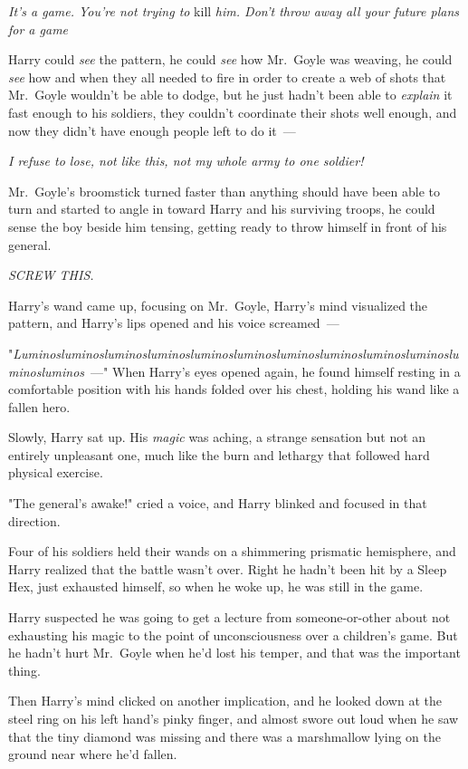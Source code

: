 \emph{It's a game. You're not trying to} kill \emph{him. Don't throw away all
your future plans for a game{\el}}

Harry could \emph{see} the pattern, he could \emph{see} how Mr.~Goyle was
weaving, he could \emph{see} how and when they all needed to fire in order to
create a web of shots that Mr.~Goyle wouldn't be able to dodge, but he just
hadn't been able to \emph{explain} it fast enough to his soldiers, they
couldn't coordinate their shots well enough, and now they didn't have enough
people left to do it~---

\emph{I refuse to lose, not like this, not my whole army to one soldier!}

Mr.~Goyle's broomstick turned faster than anything should have been able to
turn and started to angle in toward Harry and his surviving troops, he could
sense the boy beside him tensing, getting ready to throw himself in front of
his general.

\emph{SCREW THIS.}

Harry's wand came up, focusing on Mr.~Goyle, Harry's mind visualized the
pattern, and Harry's lips opened and his voice screamed~---

"\emph{Lu\-min\-os\-lu\-min\-os\-lu\-min\-os\-lu\-min\-os\-lu\-min\-os\-lu\-min\-os\-lu\-min\-os\-lu\-min\-os\-lu\-min\-os\-lu\-min\-os\-lu\-min\-os\-lu\-min\-os}~---"
\sbreak
When Harry's eyes opened again, he found himself resting in a comfortable
position with his hands folded over his chest, holding his wand like a fallen
hero.

Slowly, Harry sat up. His \emph{magic} was aching, a strange sensation but not
an entirely unpleasant one, much like the burn and lethargy that followed hard
physical exercise.

"The general's awake!" cried a voice, and Harry blinked and focused in that
direction.

Four of his soldiers held their wands on a shimmering prismatic hemisphere, and
Harry realized that the battle wasn't over. Right{\el} he hadn't been hit by
a Sleep Hex, just exhausted himself, so when he woke up, he was still in the
game.

Harry suspected he was going to get a lecture from someone-or-other about not
exhausting his magic to the point of unconsciousness over a children's game.
But he hadn't hurt Mr.~Goyle when he'd lost his temper, and that was the
important thing.

Then Harry's mind clicked on another implication, and he looked down at the
steel ring on his left hand's pinky finger, and almost swore out loud when he
saw that the tiny diamond was missing and there was a marshmallow lying on the
ground near where he'd fallen.

